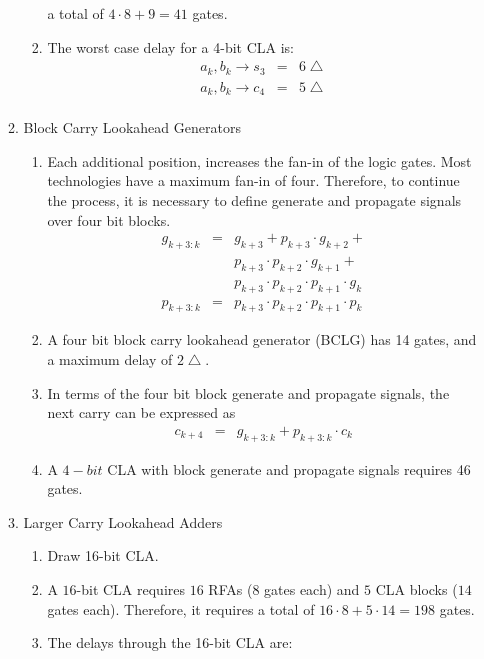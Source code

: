\documentclass[times, twocolumn, 10pt]{article}
\begin{document}
\begin{enumerate}
\begin{enumerate}
\begin{enumerate}
      a total of $4 \cdot 8 + 9 = 41$ gates. 
    \item The worst case delay for a 4-bit CLA is:
      \begin{eqnarray*}
	a_{k}, b_{k} \rightarrow s_{3} & = & 6 \bigtriangleup \\
	a_{k}, b_{k} \rightarrow c_{4} & = & 5 \bigtriangleup \\
      \end{eqnarray*}
    \end{enumerate}
  \item Block Carry Lookahead Generators
    \begin{enumerate}
    \item Each additional position, increases the fan-in of the logic gates. 
      Most technologies have a maximum fan-in of four. Therefore, to continue 
      the process, it is necessary to define generate and propagate signals 
      over four bit blocks. 
      \begin{eqnarray*}
	g_{k+3:k} & = & g_{k+3} + p_{k+3} \cdot g_{k+2} + \\
        & & p_{k+3} \cdot p_{k+2} \cdot g_{k+1} + \\
	& & p_{k+3} \cdot p_{k+2} \cdot p_{k+1} \cdot g_{k} \\
	p_{k+3:k} & = & p_{k+3} \cdot p_{k+2} \cdot p_{k+1} \cdot p_{k} 
      \end{eqnarray*}
    \item A four bit block carry lookahead generator (BCLG) has
      14 gates, and a maximum delay of $2 \bigtriangleup$. 
    \item In terms of the four bit block generate and propagate
      signals, the next carry can be expressed as 
      \begin{eqnarray*}
	c_{k+4} & = & g_{k+3:k} + p_{k+3:k} \cdot c_{k}
      \end{eqnarray*}
    \item A $4-bit$ CLA with block generate and propagate signals requires 
      46 gates. 
    \end{enumerate}
  \item Larger Carry Lookahead Adders
    \begin{enumerate}
    \item Draw 16-bit CLA. 
    \item A $16$-bit CLA requires $16$ RFAs ($8$ gates each) and
      $5$ CLA blocks ($14$ gates each). Therefore, it 
      requires a total of $16 \cdot 8 + 5 \cdot 14 = 198$ 
      gates.
    \item The delays through the 16-bit CLA are:

\end{enumerate}
\end{enumerate}
\end{enumerate}
\end{document}

